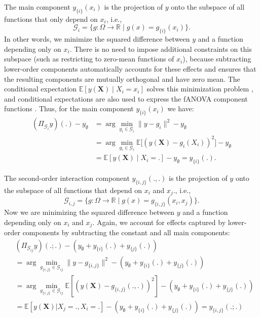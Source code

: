 The main component $y_{\{i\}}(x_i)$ is the projection of $y$ onto the subspace of all 
functions that only depend on $x_i$, i.e.,
\[
\mathcal{G}_i = \{ g : \Omega \to \mathbb{R} \mid g(x) = g_{\{i\}}(x_i) \}.
\]
In other words, we minimize the squared difference between $y$ and a function depending 
only on $x_i$. There is no need to impose additional constraints on this subspace 
(such as restricting to zero-mean functions of $x_i$), because subtracting lower-order 
components automatically accounts for these effects and ensures that the resulting 
components are mutually orthogonal and have zero mean.
The conditional expectation $\mathbb{E}[y(\boldsymbol{X}) \mid X_i = x_i]$ solves this 
minimization problem \citep{Vaart_1998}, and conditional expectations are also used to 
express the fANOVA component functions \citep{muehlenstaedt2012}. 
Thus, for the main component $y_{\{i\}}(x_i)$ we have:
\begin{align*}
    (\Pi_{\mathcal{G}_i}y)(.) - y_{\emptyset}
    &= \arg \min_{g_i \in \mathcal{G}_i} \|y - g_i\|^2 - y_{\emptyset} \\ 
    &= \arg \min_{g_i \in \mathcal{G}_i} 
       \mathbb{E}\!\big[(y(\boldsymbol{X}) - g_i(X_i))^2\big] - y_{\emptyset} \\ 
    &= \mathbb{E}[y(\boldsymbol{X}) \mid X_i = .] - y_{\emptyset} 
       = y_{\{i\}}(.).
\end{align*}


The second-order interaction component $y_{\{i,j\}}(.,.)$ is the projection of $y$ onto the subspace of all functions that depend on $x_i$ and $x_j$., i.e.,
$$\mathcal{G}_{i,j} = \{ g : \Omega \to \mathbb{R} \mid g(x) = g_{\{i,j\}}(x_i, x_j)\}.$$
Now we are minimizing the squared difference between $y$ and a function depending only on $x_i$ and $x_j$. Again, we account for effects captured by lower-order components by subtracting the constant and all main components:
\begin{align*}
    &(\Pi_{\mathcal{G}_{ij}}y)(.;.) - (y_{\emptyset} + y_{\{i\}}(.) + y_{\{j\}}(.)) \\
    &= \arg \min_{g_{\{i,j\}} \in \mathcal{G}_{ij}} \|y - g_{\{i,j\}}\|^2 - (y_{\emptyset} + y_{\{i\}}(.) + y_{\{j\}}(.))\\
    &= \arg \min_{g_{\{i,j\}} \in \mathcal{G}_{ij}} \mathbb{E}[(y(\boldsymbol{X}) - g_{\{i,j\}}(., .))^2] - (y_{\emptyset} + y_{\{i\}}(.) + y_{\{j\}}(.))\\
    &= \mathbb{E}[y(\boldsymbol{X}) | X_j = ., X_i = .] - (y_{\emptyset} + y_{\{i\}}(.) + y_{\{j\}}(.)) = y_{\{i,j\}}(.;.)
\end{align*}

